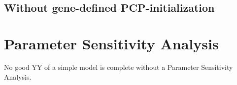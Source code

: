 \subsection{Without gene-defined PCP-initialization}

\section{Parameter Sensitivity Analysis}
No good YY of a simple model is complete without a Parameter Sensitivity Analysis.





